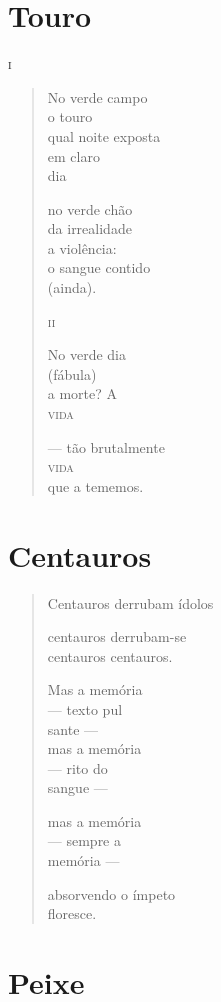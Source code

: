 \chapter{Touro}

\forceindent\textsc{i}

\begin{verse}
No verde campo\\
o touro\\
qual noite exposta\\
em claro\\
dia

no verde chão\\
da irrealidade\\
a violência:\\
o sangue contido\\
(ainda).

\medskip
\textsc{ii}

No verde dia\\
(fábula)\\
a morte? A\\
\textsc{vida}

--- tão brutalmente\\
\quad \textsc{vida}\\
\quad que a tememos.
\end{verse}

\chapter{Centauros}

\begin{verse}
Centauros derrubam ídolos

centauros derrubam-se\\
centauros centauros.

Mas a memória\\
--- texto pul\\
\qquad\qquad sante ---\\
\quad mas a memória\\
--- rito do\\
\quad\quad sangue ---

mas a memória\\
--- sempre a\\
\qquad\qquad memória ---

absorvendo o ímpeto\\
floresce.
\end{verse}

\chapter{Peixe}

